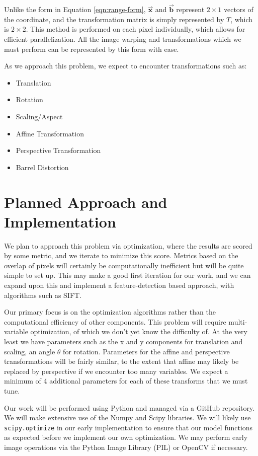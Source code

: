 \documentclass[11pt, letterpaper, notitlepage]{article}
\begin{document}
\begin{multicols}{2}
Unlike the form in Equation \ref{eqn:range-form}, $\vec{\mathbf{x}}$ and $\vec{\mathbf{b}}$ represent $2\times1$ vectors of the coordinate, and the transformation matrix is simply represented by $T$, which is $2\times2$. This method is performed on each pixel individually, which allows for efficient parallelization. All the image warping and transformations which we must perform can be represented by this form with ease.

As we approach this problem, we expect to encounter transformations such as:
\begin{itemize}
  \item Translation
  \item Rotation
  \item Scaling/Aspect
  \item Affine Transformation
  \item Perspective Transformation
  \item Barrel Distortion
\end{itemize}

\section{Planned Approach and Implementation}

We plan to approach this problem via optimization, where the results are scored by some metric, and we iterate to minimize this score. Metrics based on the overlap of pixels will certainly be computationally inefficient but will be quite simple to set up. This may make a good first iteration for our work, and we can expand upon this and implement a feature-detection based approach, with algorithms such as SIFT.

Our primary focus is on the optimization algorithms rather than the computational efficiency of other components. This problem will require multi-variable optimization, of which we don't yet know the difficulty of. At the very least we have parameters such as the x and y components for translation and scaling, an angle $\theta$ for rotation. Parameters for the affine and perspective transformations will be fairly similar, to the extent that affine may likely be replaced by perspective if we encounter too many variables. We expect a minimum of 4 additional parameters for each of these transforms that we must tune.

Our work will be performed using Python and managed via a GitHub repository. We will make extensive use of the Numpy and Scipy libraries. We will likely use \verb|scipy.optimize| in our early implementation to ensure that our model functions as expected before we implement our own optimization. We may perform early image operations via the Python Image Library (PIL) or OpenCV if necessary.


\end{multicols}
\end{document}

